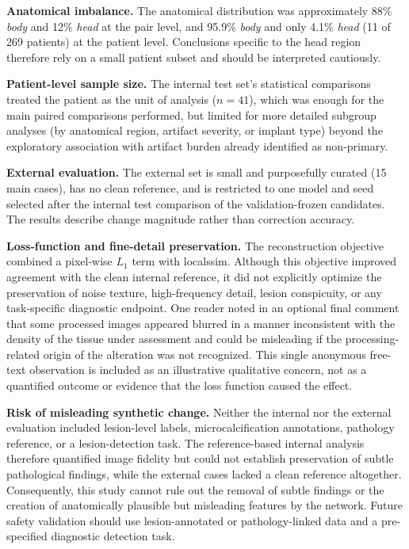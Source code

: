 \textbf{Anatomical imbalance.} The anatomical distribution was approximately 88\% \textit{body} and 12\% \textit{head} at the pair level, and 95.9\% \textit{body} and only 4.1\% \textit{head} (11 of 269 patients) at the patient level. Conclusions specific to the head region therefore rely on a small patient subset and should be interpreted cautiously.

\textbf{Patient-level sample size.} The internal test set's statistical comparisons treated the patient as the unit of analysis ($n=41$), which was enough for the main paired comparisons performed, but limited for more detailed subgroup analyses (by anatomical region, artifact severity, or implant type) beyond the exploratory association with artifact burden already identified as non-primary.

\textbf{External evaluation.} The external set is small and purposefully curated (15 main cases), has no clean reference, and is restricted to one model and seed selected after the internal test comparison of the validation-frozen candidates. The results describe change magnitude rather than correction accuracy.

\textbf{Loss-function and fine-detail preservation.} The reconstruction objective combined a pixel-wise $L_1$ term with local\acrshort{ssim}. Although this objective improved agreement with the clean internal reference, it did not explicitly optimize the preservation of noise texture, high-frequency detail, lesion conspicuity, or any task-specific diagnostic endpoint. One reader noted in an optional final comment that some processed images appeared blurred in a manner inconsistent with the density of the tissue under assessment and could be misleading if the processing-related origin of the alteration was not recognized. This single anonymous free-text observation is included as an illustrative qualitative concern, not as a quantified outcome or evidence that the loss function caused the effect.

\textbf{Risk of misleading synthetic change.} Neither the internal nor the external evaluation included lesion-level labels, microcalcification annotations, pathology reference, or a lesion-detection task. The reference-based internal analysis therefore quantified image fidelity but could not establish preservation of subtle pathological findings, while the external cases lacked a clean reference altogether. Consequently, this study cannot rule out the removal of subtle findings or the creation of anatomically plausible but misleading features by the network. Future safety validation should use lesion-annotated or pathology-linked data and a pre-specified diagnostic detection task.

